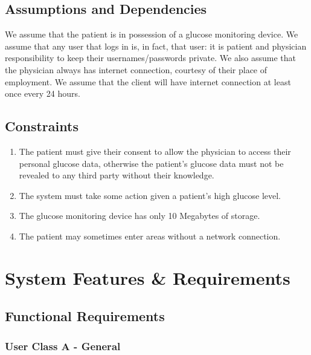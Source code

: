 \documentclass[12pt]{article}
\begin{document}
\subsection{Assumptions and Dependencies}

We assume that the patient is in possession of a glucose monitoring device.  We assume that any user that logs in is,
in fact, that user: it is patient and physician responsibility to keep their usernames/passwords private. We also assume
that the physician always has internet connection, courtesy of their place of employment.  We assume that the client will
have internet connection at least once every 24 hours.

\subsection{Constraints}

\begin{enumerate}
    \item The patient must give their consent to allow the physician to access their personal glucose data, otherwise
    the patient's glucose data must not be revealed to any third party without their knowledge.
    \item The system must take some action given a patient's high glucose level.
    \item The glucose monitoring device has only 10 Megabytes of storage.
    \item The patient may sometimes enter areas without a network connection.
\end{enumerate}

\section{System Features \& Requirements}

\subsection{Functional Requirements}

\subsubsection{User Class A - General}
\end{document}
